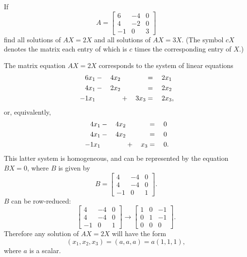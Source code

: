  If
\begin{equation*}
  A =
  \begin{bmatrix}
    6 & -4 & 0 \\
    4 & -2 & 0 \\
    -1 & 0 & 3
  \end{bmatrix}
\end{equation*}
find all solutions of $AX = 2X$ and all solutions of $AX = 3X$. (The
symbol $cX$ denotes the matrix each entry of which is $c$ times the
corresponding entry of $X$.)
\begin{solution}
  The matrix equation $AX = 2X$ corresponds to the system of linear
  equations
  \begin{alignat*}{4}
    6x_1 &{}-{}& 4x_2 && &{}={}& 2x_1 \\
    4x_1 &{}-{}& 2x_2 && &{}={}& 2x_2 \\
    -1x_1 && &{}+{}& 3x_3 &{}={}& 2x_3\rlap,
  \end{alignat*}
  or, equivalently,
  \begin{alignat*}{4}
    4x_1 &{}-{}& 4x_2 && &{}={}& 0 \\
    4x_1 &{}-{}& 4x_2 && &{}={}& 0 \\
    -1x_1 && &{}+{}& x_3 &{}={}& 0\rlap.
  \end{alignat*}
  This latter system is homogeneous, and can be represented by the
  equation $BX = 0$, where $B$ is given by
  \begin{equation*}
    B =
    \begin{bmatrix}
      4 & -4 & 0 \\
      4 & -4 & 0 \\
      -1 & 0 & 1
    \end{bmatrix}.
  \end{equation*}
  $B$ can be row-reduced:
  \begin{equation*}
    \begin{bmatrix}
      4 & -4 & 0 \\
      4 & -4 & 0 \\
      -1 & 0 & 1
    \end{bmatrix}
    \rightarrow
    \begin{bmatrix}
      1 & 0 & -1 \\
      0 & 1 & -1 \\
      0 & 0 & 0
    \end{bmatrix}.
  \end{equation*}
  Therefore any solution of $AX = 2X$ will have the form
  \begin{equation*}
    (x_1,x_2,x_3) = (a,a,a) = a(1,1,1),
  \end{equation*}
  where $a$ is a scalar.


\end{solution}
